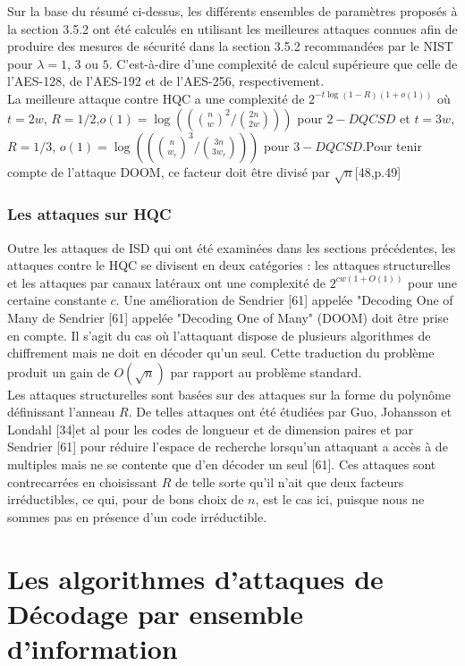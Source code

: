 \documentclass[12pt,openany]{report}
\begin{document}
Sur la base du résumé ci-dessus, les différents ensembles de paramètres proposés à la section 3.5.2 ont été calculés en utilisant les meilleures attaques connues afin de produire des mesures de sécurité
dans la section 3.5.2 
recommandées par le NIST pour $\lambda = 1$, $3$ ou $5$. C'est-à-dire d'une complexité de calcul supérieure que celle de l'AES-128, de l'AES-192 et de l'AES-256, respectivement.\\
La meilleure attaque contre HQC a une complexité de $2^{-t \log(1-\mathit{R})(1+ o(1))}$ où $t=2w$, $\mathit{R}=1/2$,$ o(1)=\log \left( ({n\choose w}^2 / {2n \choose 2w} )\right) $ pour $2-DQCSD$ et $t=3w$, $\mathit{R}=1/3$, $ o(1)=\log \left( ({n\choose w_r}^3 / {3n \choose 3w_r} )\right) $ pour $3-DQCSD$.Pour tenir compte de l'attaque DOOM, ce facteur doit être divisé par $\sqrt{n}$[48,p.49]

\subsection{Les attaques sur HQC}
Outre les attaques de ISD qui ont été examinées dans les sections précédentes, les attaques contre le
HQC se divisent en deux catégories : les attaques structurelles et les attaques par canaux latéraux ont une complexité de $2^{cw(1+O(1))}$ pour une certaine constante $c$. Une amélioration de Sendrier [61] appelée "Decoding One of Many
de Sendrier [61] appelée "Decoding One of Many" (DOOM) doit être prise en compte. Il s'agit du cas où l'attaquant dispose de plusieurs algorithmes de chiffrement mais ne doit en décoder qu'un seul.
Cette traduction du problème produit un gain de $O(\sqrt{n})$ par rapport au problème standard.\\

Les attaques structurelles sont basées sur des attaques sur la forme du polynôme définissant l'anneau $\mathit{R}$. De telles attaques ont été étudiées par Guo, Johansson et Londahl [34]et al pour les codes de longueur et de dimension paires et par
Sendrier [61] pour réduire l'espace de recherche lorsqu'un attaquant a accès à de multiples
mais ne se contente que d'en décoder un seul [61]. Ces attaques sont contrecarrées en choisissant $\mathit{R}$ de telle sorte qu'il n'ait que deux facteurs irréductibles, ce qui, pour de bons choix de $n$, est le cas ici, puisque nous ne sommes pas en présence d'un code irréductible.


\chapter{Les algorithmes d'attaques de Décodage par ensemble d'information }
\minitoc
\newpage
\end{document}
